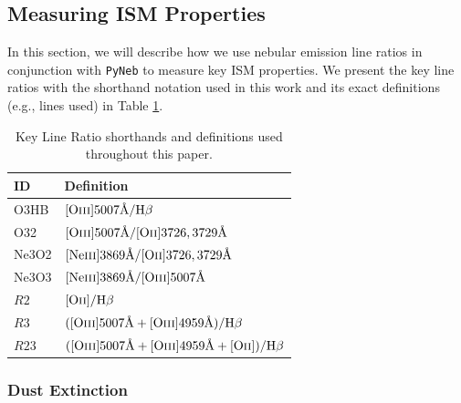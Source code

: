 \documentclass[twocolumn,tight,times,linenumbers]{aastex631}
\newcommand{\hbeta}{H$\beta$}
\newcommand{\oii}{[O{\sc ii}]}
\newcommand{\oiii}{[O{\sc iii}]}
\newcommand{\neiii}{[Ne{\sc iii}]}
\begin{document}
	
		\subsection{Measuring ISM Properties}
		\label{sec:ism_methods}
		In this section, we will describe how we use nebular emission line ratios in conjunction with \verb|PyNeb| \citep{Luridiana2015} to measure key ISM properties. We present the key line ratios with the shorthand notation used in this work and its exact definitions (e.g., lines used) in Table \ref{table:ratio_defs}.
		
		\begin{table}
			\centering
			\caption{Key Line Ratio shorthands and definitions used throughout this paper.}
			\label{table:ratio_defs}
			{\renewcommand{\arraystretch}{1.1}
				\begin{tabular*}{\columnwidth}{@{\extracolsep{\fill}}ll}
					\hline
					ID & Definition \\
					\hline
					O3HB & $\textrm{\oiii}5007\textrm{\AA}/\textrm{\hbeta}$\\
					O32 & $ \textrm{\oiii}5007\textrm{\AA}/\textrm{\oii}3726,3729\textrm{\AA}$\\
					Ne3O2 & $ \textrm{\neiii}3869\textrm{\AA}/\textrm{\oii}3726,3729\textrm{\AA}$\\
					Ne3O3 & $ \textrm{\neiii}3869\textrm{\AA}/\textrm{\oiii}5007\textrm{\AA}$\\
					$R2$ & $\textrm{\oii}/\textrm{\hbeta}$\\
					$R3$ &$(\textrm{\oiii}5007\textrm{\AA} + \textrm{\oiii}4959\textrm{\AA})/\textrm{\hbeta}$\\
					$R23$ & $(\textrm{\oiii}5007\textrm{\AA} + \textrm{\oiii}4959\textrm{\AA} + \textrm{\oii})/\textrm{\hbeta}$\\
					\hline
				\end{tabular*}
			}
		\end{table}
		
				
		\subsubsection{Dust Extinction}
		
\end{document}
